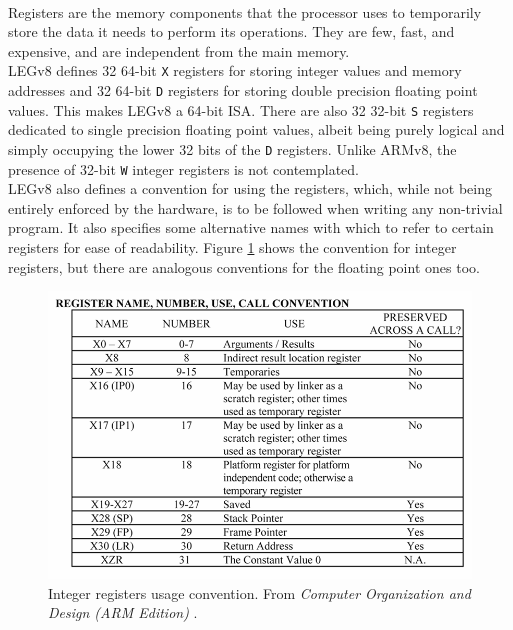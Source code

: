 \paragraph{}
Registers are the memory components that the processor uses to temporarily store the data it needs to perform its operations. They are few, fast, and expensive, and are independent from the main memory.\\
LEGv8 defines 32 64-bit \verb|X| registers for storing integer values and memory addresses and 32 64-bit \verb|D| registers for storing double precision floating point values. This makes LEGv8 a 64-bit ISA. There are also 32 32-bit \verb|S| registers dedicated to single precision floating point values, albeit being purely logical and simply occupying the lower 32 bits of the \verb|D| registers. Unlike ARMv8, the presence of 32-bit \verb|W| integer registers is not contemplated.\\
LEGv8 also defines a convention for using the registers, which, while not being entirely enforced by the hardware, is to be followed when writing any non-trivial program. It also specifies some alternative names with which to refer to certain registers for ease of readability. Figure \ref{fig:legv8intregconv} shows the convention for integer registers, but there are analogous conventions for the floating point ones too.
\begin{figure}[H]
	\centering
	\includegraphics[width=1\textwidth]{img/registers_conventions.png}
	\caption{Integer registers usage convention. From \emph{Computer Organization and Design (ARM Edition)} \cite{patterson2016computer}.}
 \label{fig:legv8intregconv}
\end{figure}

